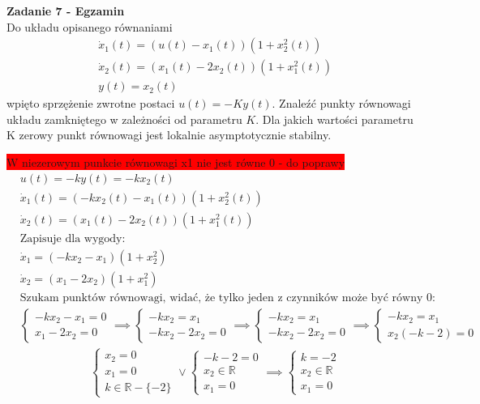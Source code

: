 \documentclass[a4paper,11pt]{article}
\begin{document}
\newpage
\begin{framed}
\textbf{Zadanie 7 - Egzamin} \\ 
Do układu opisanego równaniami
\begin{align*}
&\dot{x}_{1}(t)= (u(t)-x_1(t))(1+x_2^2(t)) \\
&\dot{x}_{2}(t)= (x_1(t)-2x_2(t))(1+x_1^2(t)) \\
&y(t)=x_2(t)
\end{align*}
wpięto sprzężenie zwrotne postaci \( u(t)=-Ky(t) \). Znaleźć punkty równowagi układu zamkniętego w zależności od parametru \( K \). Dla jakich wartości parametru K zerowy punkt równowagi jest lokalnie asymptotycznie stabilny. 
\end{framed}
\colorbox{red}{W niezerowym punkcie równowagi x1 nie jest równe 0 - do poprawy}
\begin{align*}
&u(t)=-ky(t)=-kx_2(t) \\
&\dot{x}_{1}(t)= (-kx_2(t)-x_1(t))(1+x_2^2(t)) \\
&\dot{x}_{2}(t)= (x_1(t)-2x_2(t))(1+x_1^2(t)) \\
&\text{Zapisuje dla wygody}: \\
&\dot{x}_{1}= (-kx_2-x_1)(1+x_2^2) \\
&\dot{x}_{2}= (x_1-2x_2)(1+x_1^2) \\
&\text{Szukam punktów równowagi, widać, że tylko jeden z czynników może być równy 0}: \\
&\begin{cases}
-kx_2-x_1 = 0 \\
x_1-2x_2 = 0
\end{cases} \implies
\begin{cases}
-kx_2 = x_1 \\
-kx_2-2x_2 = 0
\end{cases}
\implies
\begin{cases}
-kx_2 = x_1 \\
-kx_2-2x_2 = 0
\end{cases}
\implies
\begin{cases}
-kx_2 = x_1 \\
x_2(-k-2) = 0
\end{cases}
\end{align*}
\begin{align*}
&\begin{cases}
x_2 = 0 \\ 
x_1 = 0 \\
k \in \mathbb{R} - \{-2\}
\end{cases}
\lor
\begin{cases}
-k-2 = 0 \\
x_2 \in \mathbb{R} \\
x_1 = 0
\end{cases}
\implies
\begin{cases}
k = -2 \\
x_2 \in \mathbb{R} \\
x_1 = 0
\end{cases}
\end{align*}
\end{document}
